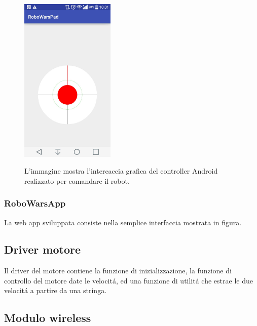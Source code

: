 \documentclass [11pt ,a4paper ,twoside ]{article}
\begin{document}
\begin{figure}
	\centering
		\includegraphics[width=0.4\textwidth]{Images/joy.jpg}
	\label{fig:joy}
	\caption{L'immagine mostra l'intercaccia grafica del controller Android realizzato per comandare il robot.}
\end{figure}

\subsubsection{RoboWarsApp}
La web app sviluppata consiste nella semplice interfaccia mostrata in figura.

\begin{center}
\end{center}

\subsection{Driver motore}

Il driver del motore contiene la funzione di inizializzazione, la funzione di controllo del motore date le velocit\'a, ed una funzione di utilit\'a che estrae le due velocit\'a a partire da una stringa.



\subsection{Modulo wireless}
\end{document}
